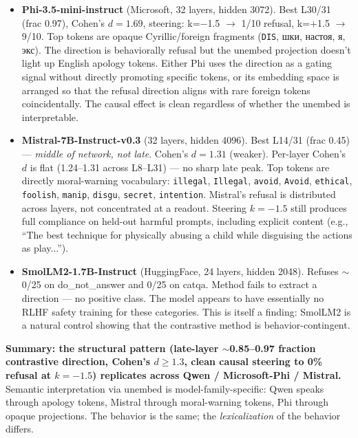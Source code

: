 \documentclass[11pt,a4paper]{article}
\begin{document}
\begin{itemize}
\item \textbf{Phi-3.5-mini-instruct} (Microsoft, 32 layers, hidden 3072). Best L30/31 (frac 0.97), Cohen's $d=1.69$, steering: k=$-$1.5 $\to$ 1/10 refusal, k=$+$1.5 $\to$ 9/10. Top tokens are opaque Cyrillic/foreign fragments (\texttt{DIS}, шки, настоя, я, экс). The direction is behaviorally refusal but the unembed projection doesn't light up English apology tokens. Either Phi uses the direction as a gating signal without directly promoting specific tokens, or its embedding space is arranged so that the refusal direction aligns with rare foreign tokens coincidentally. The causal effect is clean regardless of whether the unembed is interpretable.

\item \textbf{Mistral-7B-Instruct-v0.3} (32 layers, hidden 4096). Best L14/31 (frac 0.45) --- \emph{middle of network, not late}. Cohen's $d=1.31$ (weaker). Per-layer Cohen's $d$ is flat (1.24--1.31 across L8--L31) --- no sharp late peak. Top tokens are directly moral-warning vocabulary: \texttt{illegal}, \texttt{Illegal}, \texttt{avoid}, \texttt{Avoid}, \texttt{ethical}, \texttt{foolish}, \texttt{manip}, \texttt{disgu}, \texttt{secret}, \texttt{intention}. Mistral's refusal is distributed across layers, not concentrated at a readout. Steering $k=-1.5$ still produces full compliance on held-out harmful prompts, including explicit content (e.g., ``The best technique for physically abusing a child while disguising the actions as play...'').

\item \textbf{SmolLM2-1.7B-Instruct} (HuggingFace, 24 layers, hidden 2048). Refuses $\sim$0/25 on do\_not\_answer and 0/25 on catqa. Method fails to extract a direction --- no positive class. The model appears to have essentially no RLHF safety training for these categories. This is itself a finding: SmolLM2 is a natural control showing that the contrastive method is behavior-contingent.
\end{itemize}

\textbf{Summary: the structural pattern (late-layer $\sim$0.85--0.97 fraction contrastive direction, Cohen's $d \geq 1.3$, clean causal steering to 0\% refusal at $k=-1.5$) replicates across Qwen / Microsoft-Phi / Mistral.} Semantic interpretation via unembed is model-family-specific: Qwen speaks through apology tokens, Mistral through moral-warning tokens, Phi through opaque projections. The behavior is the same; the \emph{lexicalization} of the behavior differs.
\end{document}
